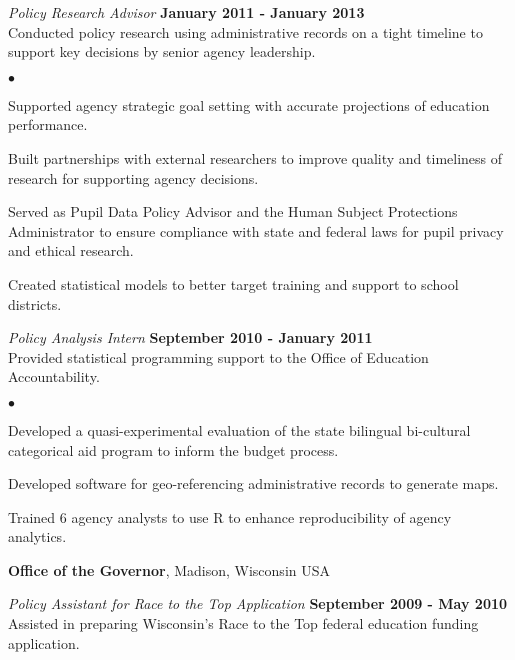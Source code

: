 \documentclass[margin,line]{res}
\newenvironment{list2}{
  \begin{list}{$\bullet$}{%
      \setlength{\itemsep}{0in}
      \setlength{\parsep}{0in} \setlength{\parskip}{0in}
      \setlength{\topsep}{0in} \setlength{\partopsep}{0in} 
      \setlength{\leftmargin}{0.2in}}}{\end{list}}
\begin{document}
\begin{resume}
\vspace*{-.3cm}
{\em Policy Research Advisor} \hfill {\bf January 2011 - January 2013} \\
Conducted policy research using administrative records on a tight timeline to 
support key decisions by senior agency leadership. \\

\vspace*{-2mm}

\begin{list2}
\item Supported agency strategic goal setting with accurate projections of education performance.
\item Built partnerships with external researchers to improve quality and 
timeliness of research for supporting agency decisions.
\item Served as Pupil Data Policy Advisor and the Human Subject Protections 
Administrator to ensure compliance with state and federal laws for pupil privacy 
and ethical research.
\item Created statistical models to better target training and support to school districts.
\end{list2}

\vspace{-.3cm}
{\em Policy Analysis Intern} \hfill {\bf September 2010 - January 2011}\\
Provided statistical programming support to the Office of Education Accountability.
\begin{list2}
\item Developed a quasi-experimental evaluation of the state bilingual bi-cultural 
categorical aid program to inform the budget process.
\item Developed software for geo-referencing administrative records to generate 
maps.
\item Trained 6 agency analysts to use R to enhance reproducibility of agency analytics. 
\end{list2}
\vspace{-.1cm}

{\bf Office of the Governor}, Madison, Wisconsin USA

\vspace{-.3cm}
{\em Policy Assistant for Race to the Top Application} \hfill {\bf September 2009 - May 2010}\\
Assisted in preparing Wisconsin's Race to the Top federal education funding 
application. 



\end{resume}
\end{document}
